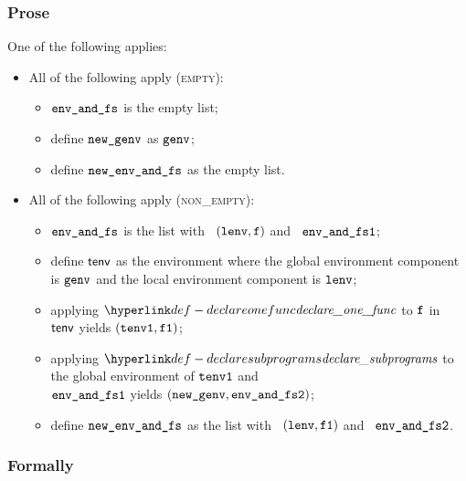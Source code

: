 \subsubsection{Prose}
One of the following applies:
\begin{itemize}
  \item All of the following apply (\textsc{empty}):
  \begin{itemize}
    \item $\texttt{env\_and\_fs}$ is the empty list;
    \item define $\texttt{new\_genv}$ as $\texttt{genv}$;
    \item define $\texttt{new\_env\_and\_fs}$ as the empty list.
  \end{itemize}

  \item All of the following apply (\textsc{non\_empty}):
  \begin{itemize}
    \item $\texttt{env\_and\_fs}$ is the list with \head\ $(\texttt{lenv}, \texttt{f})$ and \tail\ $\texttt{env\_and\_fs1}$;
    \item define $\textsf{tenv}$ as the environment where the global environment component is $\texttt{genv}$ and the local environment component is $\texttt{lenv}$;
    \item applying $\declareonefunc$ to $\texttt{f}$ in $\textsf{tenv}$ yields $(\texttt{tenv1}, \texttt{f1})$\ProseOrTypeError;
    \item applying $\declaresubprograms$ to the global environment of $\texttt{tenv1}$ and \\
          $\texttt{env\_and\_fs1}$ yields $(\texttt{new\_genv}, \texttt{env\_and\_fs2})$\ProseOrTypeError;
    \item define $\texttt{new\_env\_and\_fs}$ as the list with \head\ $(\texttt{lenv}, \texttt{f1})$ and \tail\ $\texttt{env\_and\_fs2}$.
  \end{itemize}
\end{itemize}

\subsubsection{Formally}

